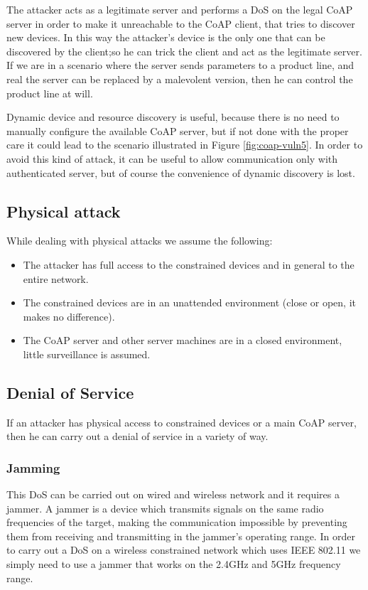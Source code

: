 	The attacker acts as a legitimate server and performs a DoS on the legal CoAP server in order to make it unreachable to the CoAP client, that tries to discover new devices.\newline
	In this way the attacker's device is the only one that can be discovered by the client;so he can trick the client and act as the legitimate server.\newline
	If we are in a scenario where the server sends parameters to a product line, and  real the server can be replaced by a malevolent version, then he can control the product line at will.\newline
	
	Dynamic device and resource discovery is useful, because there is no need to manually configure the available CoAP server, but if not done with the proper care it could lead to the scenario illustrated in Figure \ref{fig:coap-vuln5}.
	In order to avoid this kind of attack, it can be useful to allow communication only with authenticated server, but of course the convenience of dynamic discovery is lost.\newline
		

	\subsection{Physical attack}
	While dealing with physical attacks we assume the following:
	\begin{itemize}
		\item The attacker has full access to the constrained devices and in general to the entire network.
		\item The constrained devices are in an unattended environment (close or open, it makes no difference).
		\item The CoAP server and other server machines are in a closed environment, little surveillance is assumed.
	\end{itemize}
	
	\subsection{Denial of Service}
	If an attacker has physical access to constrained devices or a main CoAP server, then he can carry out a denial of service in a variety of way.\newline
	
	\subsubsection{Jamming}
	This DoS can be carried out on wired and wireless network and it requires a jammer.\newline
	A jammer is a device which transmits signals on the same radio frequencies of the target, making the communication impossible by preventing them from receiving and transmitting in the jammer’s operating range.\newline
	In order to carry out a DoS on a wireless constrained network which uses IEEE 802.11 we simply need to use a jammer that works on the 2.4GHz and 5GHz frequency range.\newline
	
